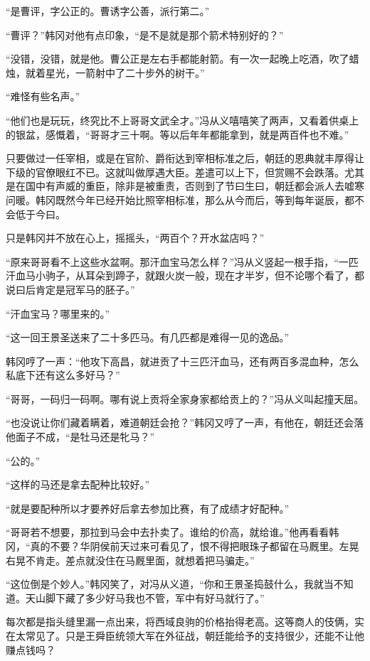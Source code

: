 “是曹评，字公正的。曹诱字公善，派行第二。”

“曹评？”韩冈对他有点印象，“是不是就是那个箭术特别好的？”

“没错，没错，就是他。曹公正是左右手都能射箭。有一次一起晚上吃酒，吹了蜡烛，就着星光，一箭射中了二十步外的树干。”

“难怪有些名声。”

“他们也是玩玩，终究比不上哥哥文武全才。”冯从义嘻嘻笑了两声，又看着供桌上的银盆，感慨着，“哥哥才三十啊。等以后年年都能拿到，就是两百件也不难。”

只要做过一任宰相，或是在官阶、爵衔达到宰相标准之后，朝廷的恩典就丰厚得让下级的官僚眼红不已。这就叫做厚遇大臣。差遣可以上下，但赏赐不会跌落。尤其是在国中有声威的重臣，除非是被重责，否则到了节曰生曰，朝廷都会派人去嘘寒问暖。韩冈既然今年已经开始比照宰相标准，那么从今而后，等到每年诞辰，都不会低于今曰。

只是韩冈并不放在心上，摇摇头，“两百个？开水盆店吗？”

“原来哥哥看不上这些水盆啊。那汗血宝马怎么样？”冯从义竖起一根手指，“一匹汗血马小驹子，从耳朵到蹄子，就跟火炭一般，现在才半岁，但不论哪个看了，都说曰后肯定是冠军马的胚子。”

“汗血宝马？哪里来的。”

“这一回王景圣送来了二十多匹马。有几匹都是难得一见的逸品。”

韩冈哼了一声：“他攻下高昌，就进贡了十三匹汗血马，还有两百多混血种，怎么私底下还有这么多好马？”

“哥哥，一码归一码啊。哪有说上贡将全家身家都给贡上的？”冯从义叫起撞天屈。

“也没说让你们藏着瞒着，难道朝廷会抢？”韩冈又哼了一声，有他在，朝廷还会落他面子不成，“是牡马还是牝马？”

“公的。”

“这样的马还是拿去配种比较好。”

“就是要配种所以才要养好后拿去参加比赛，有了成绩才好配种。”

“哥哥若不想要，那拉到马会中去扑卖了。谁给的价高，就给谁。”他再看看韩冈，“真的不要？华阴侯前天过来可看见了，恨不得把眼珠子都留在马厩里。左晃右晃不肯走。差点就没住在马厩里面，就想着把马骗走。”

“这位倒是个妙人。”韩冈笑了，对冯从义道，“你和王景圣捣鼓什么，我就当不知道。天山脚下藏了多少好马我也不管，军中有好马就行了。”

每次都是指头缝里漏一点出来，将西域良驹的价格抬得老高。这等商人的伎俩，实在太常见了。只是王舜臣统领大军在外征战，朝廷能给予的支持很少，还能不让他赚点钱吗？


